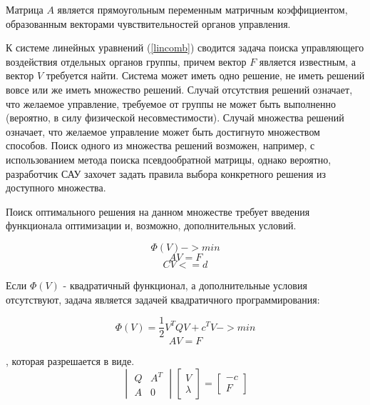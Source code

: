 \documentclass[a4paper]{article}
\begin{document}
Матрица $A$ является прямоугольным переменным матричным коэффициентом, образованным векторами чувствительностей органов управления.

К системе линейных уравнений (\ref{lincomb}) сводится задача поиска управляющего воздействия отдельных органов группы, причем вектор $F$ является известным, а вектор $V$ требуется найти. Система может иметь одно решение, не иметь решений вовсе или же иметь множество решений. Случай отсутствия решений означает, что желаемое управление, требуемое от группы не может быть выполненно (вероятно, в силу физической несовместимости). Случай множества решений означает, что желаемое управление может быть достигнуто множеством способов. Поиск одного из множества решений возможен, например, с использованием метода поиска псевдообратной матрицы, однако вероятно, разработчик САУ захочет задать правила выбора конкретного решения из доступного множества.

Поиск оптимального решения на данном множестве требует введения функционала оптимизации и, возможно, дополнительных условий.

\begin{equation}\Phi(V) -> min\end{equation}
\begin{equation}AV = F\end{equation}
\begin{equation}CV <= d\end{equation}

Если $\Phi(V)$ - квадратичный функционал, а дополнительные условия отсутствуют, задача
 является задачей квадратичного программирования:

\begin{equation}\Phi(V) = \frac{1}{2}V^TQV+c^TV -> min\end{equation}
\begin{equation}AV = F\end{equation}

, которая разрешается в виде.
\begin{equation} \label{slau}
\begin{vmatrix}
Q & A^T\\
A & 0
\end{vmatrix}
\begin{bmatrix}
V\\
\lambda
\end{bmatrix}
=
\begin{bmatrix}
-c\\
F
\end{bmatrix}
\end{equation}
\end{document}
